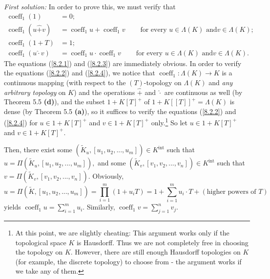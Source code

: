 \documentclass[numbers=enddot,12pt,final,onecolumn,notitlepage]{scrartcl}%
\begin{document}
\textit{First solution:} In order to prove this, we must verify that%
\begin{align}
\operatorname*{coeff}\nolimits_{1}\left(  1\right)   &  =0;\label{8.2.1}\\
\operatorname*{coeff}\nolimits_{1}\left(  u\widehat{+}v\right)   &
=\operatorname*{coeff}\nolimits_{1}u+\operatorname*{coeff}\nolimits_{1}%
v\ \ \ \ \ \ \ \ \ \ \text{for every }u\in\Lambda\left(  K\right)  \text{ and
}v\in\Lambda\left(  K\right)  ;\label{8.2.2}\\
\operatorname*{coeff}\nolimits_{1}\left(  1+T\right)   &  =1;\label{8.2.3}\\
\operatorname*{coeff}\nolimits_{1}\left(  u\widehat{\cdot}v\right)   &
=\operatorname*{coeff}\nolimits_{1}u\cdot\operatorname*{coeff}\nolimits_{1}%
v\ \ \ \ \ \ \ \ \ \ \text{for every }u\in\Lambda\left(  K\right)  \text{ and
}v\in\Lambda\left(  K\right)  . \label{8.2.4}%
\end{align}
The equations (\ref{8.2.1}) and (\ref{8.2.3}) are immediately obvious. In
order to verify the equations (\ref{8.2.2}) and (\ref{8.2.4}), we notice that
$\operatorname*{coeff}\nolimits_{1}:\Lambda\left(  K\right)  \rightarrow K$ is
a continuous mapping (with respect to the $\left(  T\right)  $-topology on
$\Lambda\left(  K\right)  $ and \textit{any arbitrary topology} on $K$) and
the operations $\widehat{+}$ and $\widehat{\cdot}$ are continuous as well (by
Theorem 5.5 \textbf{(d)}), and the subset $1+K\left[  T\right]  ^{+}$ of
$1+K\left[  \left[  T\right]  \right]  ^{+}=\Lambda\left(  K\right)  $ is
dense (by Theorem 5.5 \textbf{(a)}), so it suffices to verify the equations
(\ref{8.2.2}) and (\ref{8.2.4}) for $u\in1+K\left[  T\right]  ^{+}$ and
$v\in1+K\left[  T\right]  ^{+}$ only.\footnote{At this point, we are slightly
cheating: This argument works only if the topological space $K$ is Hausdorff.
Thus we are not completely free in choosing the topology on $K$. However,
there are still enough Hausdorff topologies on $K$ (for example, the discrete
topology) to choose from - the argument works if we take any of them.} So let
$u\in1+K\left[  T\right]  ^{+}$ and $v\in1+K\left[  T\right]  ^{+}$.

Then, there exist some $\left(  \widetilde{K}_{u},\left[  u_{1},u_{2}%
,...,u_{m}\right]  \right)  \in K^{\operatorname*{int}}$ such that
$u=\Pi\left(  \widetilde{K}_{u},\left[  u_{1},u_{2},...,u_{m}\right]  \right)
,$ and some $\left(  \widetilde{K}_{v},\left[  v_{1},v_{2},...,v_{n}\right]
\right)  \in K^{\operatorname*{int}}$ such that $v=\Pi\left(  \widetilde{K}%
_{v},\left[  v_{1},v_{2},...,v_{n}\right]  \right)  .$ Obviously,%
\[
u=\Pi\left(  \widetilde{K},\left[  u_{1},u_{2},...,u_{m}\right]  \right)
=\prod_{i=1}^{m}\left(  1+u_{i}T\right)  =1+\sum_{i=1}^{m}u_{i}\cdot T+\left(
\text{higher powers of }T\right)
\]
yields $\operatorname*{coeff}\nolimits_{1}u=\sum\limits_{i=1}^{m}u_{i}.$
Similarly, $\operatorname*{coeff}\nolimits_{1}v=\sum\limits_{j=1}^{n}v_{j}$.
\end{document}
